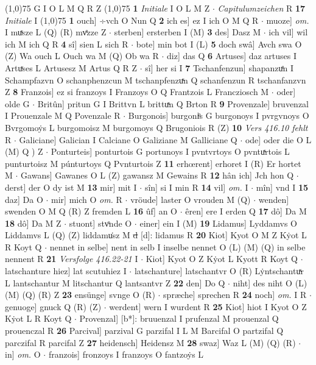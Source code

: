 \documentclass[8pt,a4paper,notitlepage]{article}
\begin{document}
\begin{table}[ht]
\begin{minipage}[t]{0.5\linewidth}
\begin{tabular}{rl}
\end{tabular}
\scriptsize
\line(1,0){75} \newline
G I O L M Q R Z \newline
\line(1,0){75} \newline
\textbf{1} \textit{Initiale} I O L M Z   $\cdot$ \textit{Capitulumzeichen} R  \textbf{17} \textit{Initiale} I  \newline
\line(1,0){75} \newline
\textbf{1} ouch] ÷vch O Nun Q \textbf{2} ich es] ez I ich O M Q R  $\cdot$ muoze] \textit{om.} I muͯsze L (Q) (R) mvͤzze Z  $\cdot$ sterben] ersterben I (M) \textbf{3} des] Dasz M  $\cdot$ ich vil] wil ich M ich Q R \textbf{4} sî] sien L sich R  $\cdot$ bote] min bot I (L) \textbf{5} doch swâ] Avch swa O (Z) Wa ouch L Ouch wa M (Q) Ob wa R  $\cdot$ diz] das Q \textbf{6} Artuses] daz artuses I Artuͯses L Artusesz M Artus Q R Z  $\cdot$ sî] her si I \textbf{7} Tschanfenzun] shapanzuͤn I Schampfazvn O schanphenzcun M tschanpfenzuͯn Q schanfenzun R tschanfanzvn Z \textbf{8} Franzois] ez si franzoys I Franzoys O Q Frantzois L Francziosch M  $\cdot$ oder] olde G  $\cdot$ Britûn] pritun G I Brittvn L brittuͯn Q Brton R \textbf{9} Provenzale] bruvenzal I Prouenzale M Q Povenzale R  $\cdot$ Burgonois] burgoniͦs G burgonoys I pvrgvnoys O Bvrgomoẏs L burgomoisz M burgomoys Q Brugoniois R (Z) \textbf{10} \textit{Vers 416.10 fehlt} R   $\cdot$ Galiciane] Galician I Calciane O Galiziane M Galliciane Q  $\cdot$ ode] oder die O L (M) Q ) Z  $\cdot$ Ponturteis] ponturtois G portunoys I pvntvrtoys O pvntuͯrtois L punturtoisz M púnturtoys Q Pvnturtois Z \textbf{11} erhœrent] erhoret I (R) Er hortet M  $\cdot$ Gawans] Gawanes O L (Z) gawansz M Gewains R \textbf{12} hân ich] Jch hon Q  $\cdot$ derst] der O dy ist M \textbf{13} mir] mit I  $\cdot$ sîn] si I min R \textbf{14} vil] \textit{om.} I  $\cdot$ mîn] vnd I \textbf{15} daz] Da O  $\cdot$ mir] mich O \textit{om.} R  $\cdot$ vröude] laster O vrouden M (Q)  $\cdot$ wenden] swenden O M Q (R) Z fremden L \textbf{16} ûf] an O  $\cdot$ êren] ere I erden Q \textbf{17} dô] Da M \textbf{18} dô] Da M Z  $\cdot$ stuont] stvͦnde O  $\cdot$ einer] ein I (M) \textbf{19} Lidamus] Lyddamvs O Liddamvs L (Q) (Z) liddamu͑sz M \sout{d} [d]: lidamus R \textbf{20} Kiot] Kyot O M Z Kẏot L R Koyt Q  $\cdot$ nennet in selbe] nent in selb I inselbe nennet O (L) (M) (Q) in selbe nennent R \textbf{21} \textit{Versfolge 416.22-21} I   $\cdot$ Kiot] Kyot O Z Kẏot L Kyott R Koyt Q  $\cdot$ latschanture hiez] lat scutuhiez I  $\cdot$ latschanture] latschantvr O (R) Lẏntschantuͯr L lantschantur M litschantur Q lantsantvr Z \textbf{22} den] Do Q  $\cdot$ niht] des niht O (L) (M) (Q) (R) Z \textbf{23} ensünge] svnge O (R)  $\cdot$ spræche] sprechen R \textbf{24} noch] \textit{om.} I R  $\cdot$ genuoge] gnuck Q (R) (Z)  $\cdot$ werdent] wern I wurdent R \textbf{25} Kiot] hiot I Kyot O Z Kẏot L R Koyt Q  $\cdot$ Provenzal] [b*]: bruuenzal I prufenzal M prouenzal Q prouenczal R \textbf{26} Parcival] parzival G parzifal I L M Barcifal O partzifal Q parczifal R parcifal Z \textbf{27} heidensch] Heidensz M \textbf{28} swaz] Waz L (M) (Q) (R)  $\cdot$ in] \textit{om.} O  $\cdot$ franzois] fronzoys I franzoys O fantzoẏs L 
\end{minipage}
\end{table}
\end{document}
